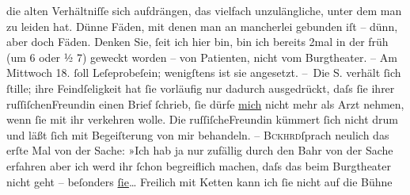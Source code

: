 \begin{ledgroupsized}[t]{13cm}
               die alten Verhältniſſe sich aufdrängen, das vielfach unzulängliche, unter dem man zu
               leiden hat. Dünne Fäden, mit denen {\pb}man an mancherlei
               gebunden iſt – dünn, aber doch Fäden. Denken Sie, ſeit ich hier bin, bin ich bereits
               2mal in der früh \introOben{}(um 6 oder ½ 7)\introOben{} geweckt worden – von
               Patienten, nicht vom Burgtheater. – Am Mittwoch 18.
               ſoll Leſeprobeſein; wenigſtens ist sie angesetzt.\pend
           \pstart
           – Die S. verhält ſich ſtille; ihre Feindſeligkeit
               hat ſie vorläufig nur dadurch ausgedrückt, daſs ſie ihrer ruſſiſchenFreundin einen Brief ſchrieb,
               ſie dürfe \uline{mich} nicht mehr als Arzt nehmen, wenn ſie
               mit ihr verkehren wolle. Die ruſſiſcheFreundin kümmert ſich nicht
               drum {\pb}und läßt ſich mit Begeiſterung von mir
               behandeln. – \textsc{Bckhrd}ſprach neulich das erſte Mal von der Sache: »Ich
               hab ja nur zufällig durch den Bahr von der Sache
               erfahren {\dotstwo} aber ich werd ihr ſchon begreiflich machen,
               daſs das beim Burgtheater nicht geht – beſonders \uline{ſie}{\dots} Freilich mit Ketten kann ich ſie nicht auf die Bühne

\end{ledgroupsized}
